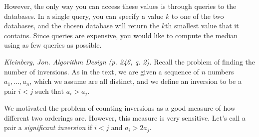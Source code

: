 \documentclass[solutionorbox,answers]{exam}
\begin{document}
\begin{questions}
However, the only way you can access these values is through queries to the databases. In a single query, you can specify a value $k$ to one of the two databases, and the chosen database will return the $k$th smallest value that it contains. Since queries are expensive, you would like to compute the median using as few queries as possible. 



  \question \textit{Kleinberg, Jon. Algorithm Design (p. 246, q. 2).} Recall the problem of finding the number of inversions. As in the text, we are given a sequence of $n$ numbers $a_1,..., a_n$, which we assume are all distinct, and we define an inversion to be a pair $i < j$ such that $a_i > a_j$. 

  We motivated the problem of counting inversions as a good measure of how different two orderings are. However, this measure is very sensitive. Let’s call a pair a \emph{significant inversion} if $i < j$ and  $a_i > 2a_j$. 

\end{questions}
\end{document}
